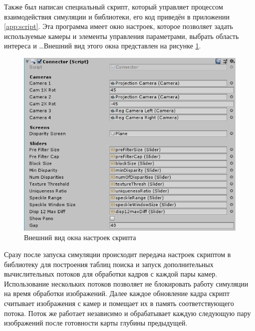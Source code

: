 Также был написан специальный скрипт, который управляет процессом взаимодействия симуляции и библиотеки, 
его код приведён в приложении \ref{app:script}. Эта программа имеет окно настроек, которое позволяет задать
используемые камеры и элементы управления параметрами, выбрать область интереса и \dots Внешний вид этого 
окна представлен на рисунке \ref{pic:connec_inter}.
\begin{figure}[H]
    \begin{center}
        \includegraphics[scale=0.5]{pics/connector_settings.png}                                                                                            
        \caption{Внешний вид окна настроек скрипта}
        \label{pic:connec_inter}
    \end{center}
\end{figure}
Сразу после запуска симуляции происходит передача настроек скриптом в библиотеку для построения таблиц поиска           %
и запуск дополнительных вычислительных потоков для обработки кадров с каждой пары камер. Использование
нескольких потоков позволяет не блокировать работу симуляции на время обработки изображений.  Далее каждое обновление
кадра скрипт считывает изображения с камер и помещает их в память соответствующего потока. Поток же работает независимо 
и обрабатывает каждую следующую пару изображений после готовности карты глубины предыдущей. 
